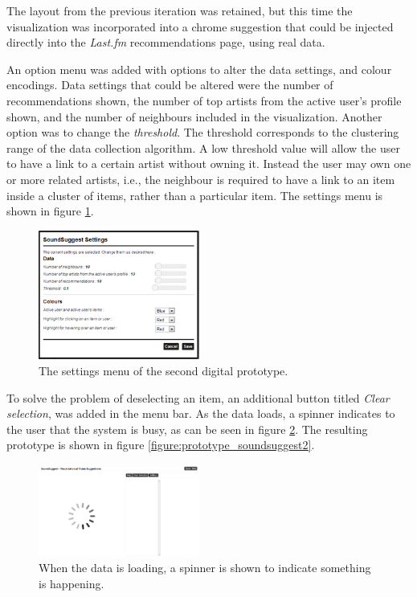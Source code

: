 The layout from the previous iteration was retained, but this time the visualization was incorporated into a chrome suggestion that could be injected directly into the \emph{Last.fm} recommendations page, using real data.

An option menu was added with options to alter the data settings, and colour encodings. Data settings that could be altered were the number of recommendations shown, the number of top artists from the active user's profile shown, and the number of neighbours included in the visualization. Another option was to change the \emph{threshold}. The threshold corresponds to the clustering range of the data collection algorithm. A low threshold value will allow the user to have a link to a certain artist without owning it. Instead the user may own one or more related artists, i.e., the neighbour is required to have a link to an item inside a cluster of items, rather than a particular item. The settings menu is shown in figure \ref{figure:prototype_soundsuggest2_settings}.

\begin{figure}%
	\begin{center}
		\includegraphics[width=200px]{img/prototype_soundsuggest2_settings}%
	\end{center}
	\caption{The settings menu of the second digital prototype.}%
	\label{figure:prototype_soundsuggest2_settings}%
\end{figure}


To solve the problem of deselecting an item, an additional button titled \emph{Clear selection}, was added in the menu bar. As the data loads, a spinner indicates to the user that the system is busy, as can be seen in figure \ref{figure:prototype_soundsuggest2_loading_data}. The resulting prototype is shown in figure \ref{figure:prototype_soundsuggest2}.

\begin{figure}%
	\begin{center}
		\includegraphics[width=200px]{img/prototype_soundsuggest2_loading_data}%
	\end{center}
	\caption{When the data is loading, a spinner is shown to indicate something is happening.}%
	\label{figure:prototype_soundsuggest2_loading_data}%
\end{figure}


